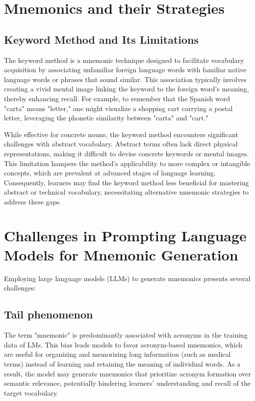 \documentclass[11pt, onecolumn]{article}
\begin{document}
\section{Mnemonics and their Strategies} \label{sec:mnemonic-strategies}
\subsection{Keyword Method and Its Limitations} \label{sec:keyword-method}

The keyword method is a mnemonic technique designed to facilitate vocabulary acquisition by associating unfamiliar foreign language words with familiar native language words or phrases that sound similar. This association typically involves creating a vivid mental image linking the keyword to the foreign word's meaning, thereby enhancing recall. For example, to remember that the Spanish word "carta" means "letter," one might visualize a shopping cart carrying a postal letter, leveraging the phonetic similarity between "carta" and "cart."

While effective for concrete nouns, the keyword method encounters significant challenges with abstract vocabulary. Abstract terms often lack direct physical representations, making it difficult to devise concrete keywords or mental images. This limitation hampers the method's applicability to more complex or intangible concepts, which are prevalent at advanced stages of language learning. Consequently, learners may find the keyword method less beneficial for mastering abstract or technical vocabulary, necessitating alternative mnemonic strategies to address these gaps.

\section{Challenges in Prompting Language Models for Mnemonic Generation}

Employing large language models (LLMs) to generate mnemonics presents several challenges:

\subsection{Tail phenomenon}

The term "mnemonic" is predominantly associated with acronyms in the training data of LMs. This bias leads models to favor acronym-based mnemonics, which are useful for organizing and memorizing long information (such as medical terms) instead of learning and retaining the meaning of individual words. As a result, the model may generate mnemonics that prioritize acronym formation over semantic relevance, potentially hindering learners' understanding and recall of the target vocabulary.
\end{document}
